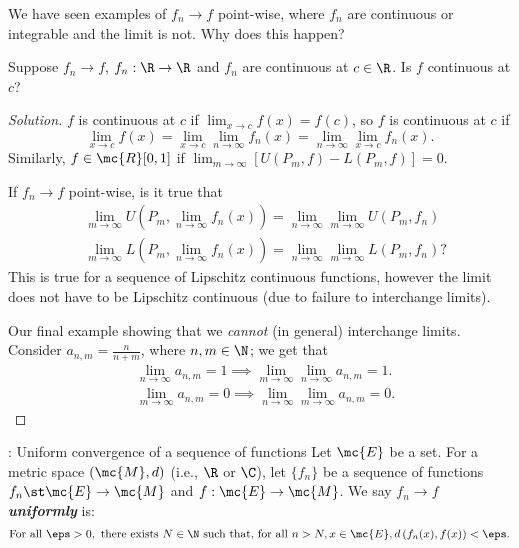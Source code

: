 \begin{fft}
	We have seen examples of \(f_n\to f\) point-wise, where \(f_n\) are continuous or integrable and the limit is not. Why does this happen?
	
	\medskip
	
	Suppose \(f_n\to f\), \(f_n:\R\to\R\) and \(f_n\) are continuous at \(c\in\R\). Is \(f\) continuous at \(c\)?
\end{fft}
\begin{proof}[Solution]
	\(f\) is continuous at \(c\) if \(\displaystyle\lim_{x\to c}f(x)=f(c)\), so \(f\) is continuous at \(c\) if 
	\begin{equation*}
		\lim_{x\to c} f(x)=\lim_{x\to c}\lim_{n\to\infty} f_n(x)=\lim_{n\to\infty}\lim_{x\to c} f_n(x).
	\end{equation*}
	Similarly, \(f\in\mc{R}[0,1]\) if \(\displaystyle\lim_{m\to\infty}[U(P_m,f)-L(P_m,f)]=0\).
	
	\medskip
	
	If \(f_n\to f\) point-wise, is it true that 
	\begin{align*}
		&\lim_{m\to\infty}U\left(P_m,\lim_{n\to\infty}f_n(x)\right)=\lim_{n\to\infty}\lim_{m\to\infty}U(P_m,f_n)\\
		&\lim_{m\to\infty}L\left(P_m,\lim_{n\to\infty}f_n(x)\right)=\lim_{n\to\infty}\lim_{m\to\infty}L(P_m,f_n)?
	\end{align*}
	This is true for a sequence of Lipschitz continuous functions, however the limit does not have to be Lipschitz continuous (due to failure to interchange limits).
	
	\medskip
	
	Our final example showing that we \emph{cannot} (in general) interchange limits. Consider \(a_{n,m}=\displaystyle\frac{n}{n+m}\), where \(n,m\in\N\); we get that 
	\begin{align*}
		&\lim_{n\to\infty} a_{n,m}=1\implies \lim_{m\to\infty}\lim_{n\to\infty} a_{n,m}=1.\\
		&\lim_{m\to\infty}a_{n,m}=0\implies \lim_{n\to\infty}\lim_{m\to\infty}a_{n,m}=0.
	\end{align*}
\end{proof}

\begin{ndef}{: Uniform convergence of a sequence of functions}
	Let \(\mc{E}\) be a set. For a metric space \((\mc{M},d)\) (i.e., \(\R\) or \(\C\)), let \(\{f_n\}\) be a sequence of functions \(f_n\st \mc{E}\to\mc{M}\) and \(f:\mc{E}\to\mc{M}\). We say \(f_n\to f\) \emph{\textbf{uniformly}} is:
	\begin{equation*}
		\text{For all}~\eps>0,~\text{there exists}~N\in\N~\text{such that, for all}~n>N,x\in\mc{E},d\left(f_n(x),f(x)\right)<\eps.
	\end{equation*}
\end{ndef}

